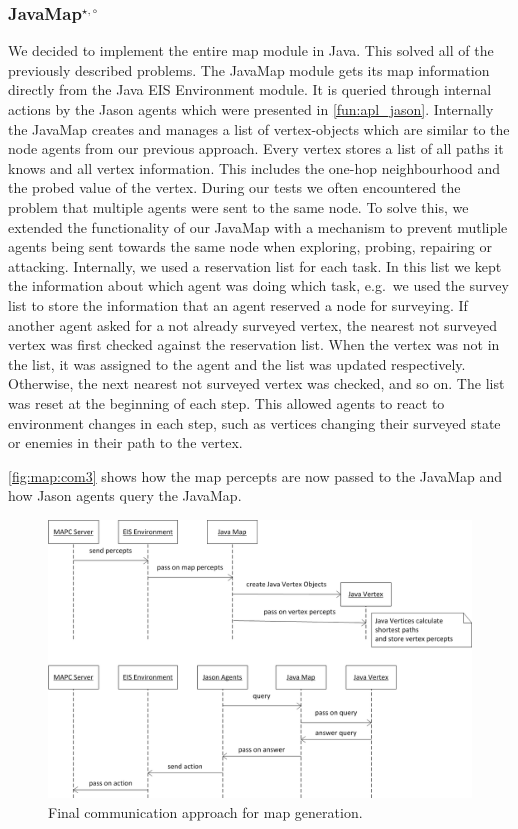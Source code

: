 \subsubsection[JavaMap]{JavaMap$^{\star,\circ}$}\label{alg:map_javamap}
We decided to implement the entire map module in Java.
This solved all of the previously described problems.
The JavaMap module gets its map information directly from the Java EIS Environment module.
It is queried through internal actions by the Jason agents which were presented in \autoref{fun:apl_jason}.
Internally the JavaMap creates and manages a list of vertex-objects which are similar to the node agents from our previous approach.
Every vertex stores a list of all paths it knows and all vertex information.
This includes the one-hop neighbourhood and the probed value of the vertex.
During our tests we often encountered the problem that multiple agents were sent to the same node.
To solve this, we extended the functionality of our JavaMap with a mechanism to prevent mutliple agents being sent towards the same node when exploring, probing, repairing or attacking.
Internally, we used a reservation list for each task.
In this list we kept the information about which agent was doing which task, e.g.\ we used the survey list to store the information that an agent reserved a node for surveying.
If another agent asked for a not already surveyed vertex, the nearest not surveyed vertex was first checked against the reservation list.
When the vertex was not in the list, it was assigned to the agent and the list was updated respectively.
Otherwise, the next nearest not surveyed vertex was checked, and so on.
The list was reset at the beginning of each step.
This allowed agents to react to environment changes in each step, such as vertices changing their surveyed state or enemies in their path to the vertex.

\autoref{fig:map:com3} shows how the map percepts are now passed to the JavaMap and how Jason agents query the JavaMap.
\begin{figure}
  \centering
  \includegraphics[width=\linewidth]{images/map_com_3.png}
  \caption{Final communication approach for map generation.}
  \label{fig:map:com3}
\end{figure}

